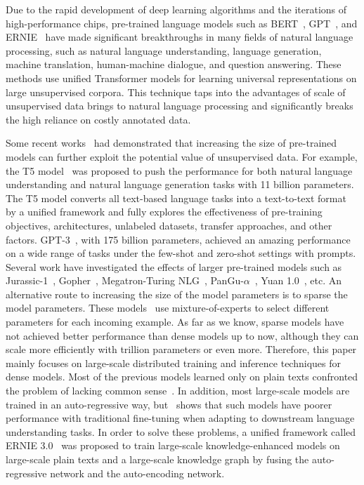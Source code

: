 Due to the rapid development of deep learning algorithms and the iterations of high-performance chips, pre-trained language models such as BERT~\cite{devlin2018bert}, GPT~\cite{radford2018improving}, and ERNIE~\cite{sun2019ernie} have made significant breakthroughs in many fields of natural language processing, such as natural language understanding, language generation, machine translation, human-machine dialogue, and question answering. These methods use unified Transformer models for learning universal representations on large unsupervised corpora. This technique taps into the advantages of scale of unsupervised data brings to natural language processing and significantly breaks the high reliance on costly annotated data. 

Some recent works~\cite{Megatron-LM,T5,gpt-3,switch-transformer} had demonstrated that increasing the size of pre-trained models can further exploit the potential value of unsupervised data. For example, the T5 model~\cite{T5} was proposed to push the performance for both natural language understanding and natural language generation tasks with 11 billion parameters. The T5 model converts all text-based language tasks into a text-to-text format by a unified framework and fully explores the effectiveness of pre-training objectives, architectures, unlabeled datasets, transfer approaches, and other factors. GPT-3~\cite{gpt-3}, with 175 billion parameters, achieved an amazing performance on a wide range of tasks under the few-shot and zero-shot settings with prompts. Several work have investigated the effects of larger pre-trained models such as Jurassic-1~\cite{jurassic-1},  Gopher~\cite{gopher}, Megatron-Turing NLG~\cite{megatron-nlg}, PanGu-$\alpha$~\cite{zeng2021pangu}, Yuan 1.0~\cite{wu2021yuan}, etc. An alternative route to increasing the size of the model parameters is to sparse the model parameters. These models~\cite{switch-transformer,lewis2021base,roller2021hash,zhang2021cpm,lin2021m6} use mixture-of-experts to select different parameters for each incoming example. As far as we know, sparse models have not achieved better performance than dense models up to now, although they can scale more efficiently with trillion parameters or even more. Therefore, this paper mainly focuses on large-scale distributed training and inference techniques for dense models. Most of the previous models learned only on plain texts confronted the problem of lacking common sense~\cite{rise_risk_gpt3}. In addition, most large-scale models are trained in an auto-regressive way, but~\cite{devlin2018bert} shows that such models have poorer performance with traditional fine-tuning when adapting to downstream language understanding tasks. In order to solve these problems, a unified framework called ERNIE 3.0~\cite{sun2021ernie} was proposed to train large-scale knowledge-enhanced models on large-scale plain texts and a large-scale knowledge graph by fusing the auto-regressive network and the auto-encoding network.

